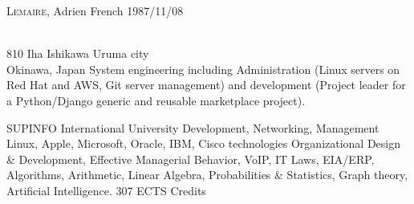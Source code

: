 \documentclass[english]{ecv}
\begin{document}
\begin{ecv}


   {\textsc{Lemaire}, Adrien}
 {}
                {French}
                {1987/11/08}


                {\\
                810 Iha Ishikawa Uruma city\\Okinawa, Japan}
%
                {System engineering including Administration (Linux servers on 
                  Red Hat and AWS, Git server management) and development 
                  (Project leader for a Python/Django generic and reusable 
                  marketplace project).}


                {}
                {SUPINFO International University}
                {Development, Networking, Management}
                {Linux, Apple, Microsoft, Oracle, IBM, Cisco technologies\ecvNewLine
                Organizational Design \& Development, Effective Managerial
                Behavior, VoIP, IT Laws, EIA/ERP, Algorithms, Arithmetic, Linear
                Algebra, Probabilities \& Statistics, Graph theory, Artificial
                Intelligence.}
   {307 ECTS Credits}


\end{ecv}
\end{document}
